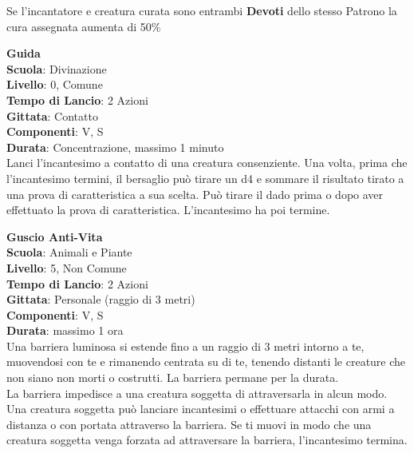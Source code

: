 \begin{multicols}{2}
Se l'incantatore e creatura curata sono entrambi \textbf{Devoti} dello stesso Patrono la cura assegnata aumenta di 50\%

\medskip\textbf{Guida}\\
\textbf{Scuola}: Divinazione\\
\textbf{Livello}: 0, Comune\\
\textbf{Tempo di Lancio}: 2 Azioni\\
\textbf{Gittata}: Contatto\\
\textbf{Componenti}: V, S\\
\textbf{Durata}: Concentrazione, massimo 1 minuto\\
Lanci l'incantesimo a contatto di una creatura consenziente. Una volta, prima che l'incantesimo termini, il bersaglio può tirare un d4 e sommare il risultato tirato a una prova di caratteristica a sua scelta. Può tirare il dado prima o dopo aver effettuato la prova di caratteristica. L'incantesimo ha poi termine.

\medskip\textbf{Guscio Anti-Vita}\\
\textbf{Scuola}: Animali e Piante\\
\textbf{Livello}: 5, Non Comune\\
\textbf{Tempo di Lancio}: 2 Azioni\\
\textbf{Gittata}: Personale (raggio di 3 metri)\\
\textbf{Componenti}: V, S\\
\textbf{Durata}: massimo 1 ora\\
Una barriera luminosa si estende fino a un raggio di 3 metri intorno a te, muovendosi con te e rimanendo centrata su di te, tenendo distanti le creature che non siano non morti o costrutti. La barriera permane per la durata. \\
La barriera impedisce a una creatura soggetta di attraversarla in alcun modo. Una creatura soggetta può lanciare incantesimi o effettuare attacchi con armi a distanza o con portata attraverso la barriera. Se ti muovi in modo che una creatura soggetta venga forzata ad attraversare la barriera, l'incantesimo termina.


\end{multicols}
